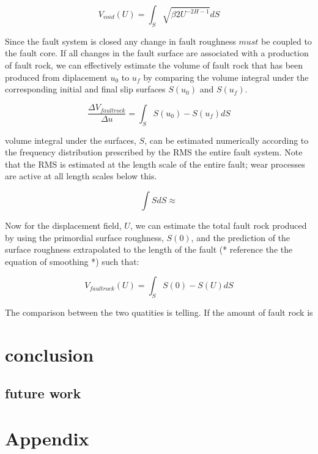 \documentclass[12pt,a4paper]{article}
\begin{document}
\begin{equation}
	V_{void}(U) = \int_S \sqrt{\beta 2U^{-2H-1}}dS
\end{equation}

Since the fault system is closed any change in fault roughness $must$ be coupled to the fault core. If all changes in the fault surface are associated with a production of fault rock, we can effectively estimate the volume of fault rock that has been produced from diplacement $u_0$ to $u_f$ by comparing the volume integral under the corresponding initial and final slip surfaces $S(u_0)$ and $S(u_f)$.

\begin{equation}
	\dfrac {\Delta V_{fault rock}}{\Delta u} = \int_S S(u_0) - S(u_f) dS
\end{equation}

volume integral under the surfaces, $S$, can be estimated numerically according to the frequency distribution prescribed by the RMS the  entire fault system. Note that the RMS is estimated at the length scale of the entire fault; wear processes are active at all length scales below this.

\begin{equation}
	\int S dS \approx 
\end{equation}

Now for the displacement field, $U$, we can estimate the total fault rock produced by using the primordial surface roughness, $S(0)$, and the prediction of the surface roughness extrapolated to the length of the fault (* reference the the equation of smoothing *) such that:

\begin{equation}
	V_{fault rock}(U) = \int_S S(0)-S(U)dS
\end{equation}

The comparison between the two quatities is telling. If the amount of fault rock is

\section{conclusion}
	\subsection{future work}





\section{Appendix}
\end{document}

